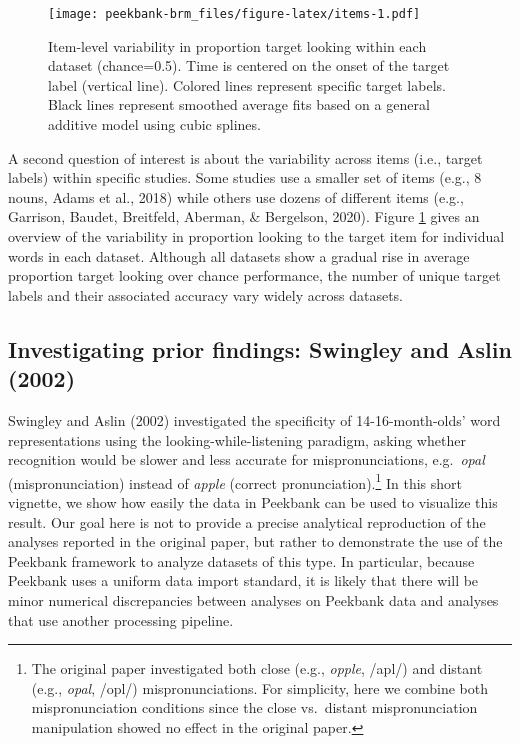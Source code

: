 \documentclass[
  english,
  man,floatsintext]{apa6}
\begin{document}
\begin{figure}
\centering
\texttt{[image: peekbank-brm\_files/figure-latex/items-1.pdf]}
\caption{\label{fig:items}Item-level variability in proportion target looking within each dataset (chance=0.5). Time is centered on the onset of the target label (vertical line). Colored lines represent specific target labels. Black lines represent smoothed average fits based on a general additive model using cubic splines.}
\end{figure}

A second question of interest is about the variability across items (i.e., target labels) within specific studies. Some studies use a smaller set of items (e.g., 8 nouns, Adams et al., 2018) while others use dozens of different items (e.g., Garrison, Baudet, Breitfeld, Aberman, \& Bergelson, 2020). Figure \ref{fig:items} gives an overview of the variability in proportion looking to the target item for individual words in each dataset. Although all datasets show a gradual rise in average proportion target looking over chance performance, the number of unique target labels and their associated accuracy vary widely across datasets.

\hypertarget{investigating-prior-findings-swingley2002}{%
\subsection{Investigating prior findings: Swingley and Aslin (2002)}\label{investigating-prior-findings-swingley2002}}

Swingley and Aslin (2002) investigated the specificity of 14-16-month-olds' word representations using the looking-while-listening paradigm, asking whether recognition would be slower and less accurate for mispronunciations, e.g.~\emph{opal} (mispronunciation) instead of \emph{apple} (correct pronunciation).\footnote{The original paper investigated both close (e.g., \emph{opple}, /apl/) and distant (e.g., \emph{opal}, /opl/) mispronunciations. For simplicity, here we combine both mispronunciation conditions since the close vs.~distant mispronunciation manipulation showed no effect in the original paper.} In this short vignette, we show how easily the data in Peekbank can be used to visualize this result. Our goal here is not to provide a precise analytical reproduction of the analyses reported in the original paper, but rather to demonstrate the use of the Peekbank framework to analyze datasets of this type. In particular, because Peekbank uses a uniform data import standard, it is likely that there will be minor numerical discrepancies between analyses on Peekbank data and analyses that use another processing pipeline.
\end{document}
